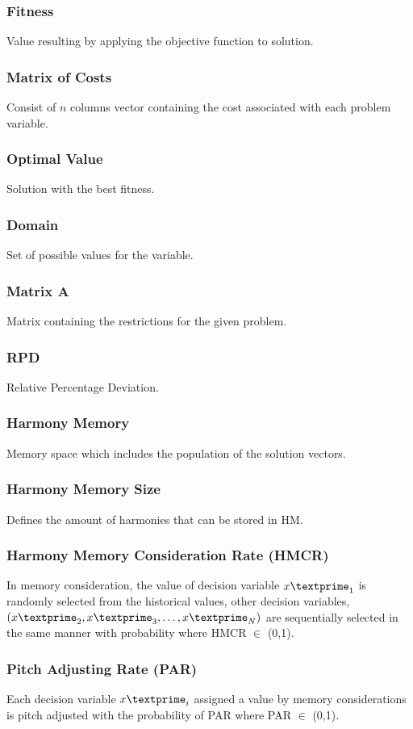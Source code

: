 \subsubsection{Fitness} 
Value resulting by applying the objective function to solution.

\subsubsection{Matrix of Costs} 
Consist of $n$ columns vector containing the cost associated with each problem variable.

\subsubsection{Optimal Value} 
Solution with the best fitness.

\subsubsection{Domain} 
Set of possible values for the variable.

\subsubsection{Matrix A} 
Matrix containing the restrictions for the given problem.

\subsubsection{RPD} 
Relative Percentage Deviation.

\subsubsection{Harmony Memory} 
Memory space which includes the population of the solution vectors.

\subsubsection{Harmony Memory Size} 
Defines the amount of harmonies that can be stored in HM.

\subsubsection{Harmony Memory Consideration Rate (HMCR)} 
In memory consideration, the value of decision variable ${x\textprime}_1$ is randomly selected from the historical values, other decision variables, $({x\textprime}_2, {x\textprime}_3,\dots,{x\textprime}_N)$ are sequentially selected in the same manner with probability where HMCR $\in$ (0,1).

\subsubsection{Pitch Adjusting Rate (PAR)} 
Each decision variable ${x\textprime}_i$ assigned a value by memory considerations is pitch adjusted with the probability of PAR where PAR $\in$ (0,1).




